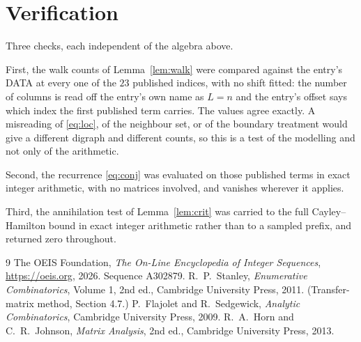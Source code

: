 \documentclass[11pt,a4paper]{article}
\theoremstyle{plain}
\theoremstyle{definition}
\begin{document}
\section{Verification}

Three checks, each independent of the algebra above.

First, the walk counts of Lemma~\ref{lem:walk} were compared against the entry's DATA at
every one of the $23$ published indices, with no shift fitted: the number of columns is
read off the entry's own name as $L=n$ and the entry's offset says which index the first
published term carries. The values agree exactly. A misreading of \eqref{eq:loc}, of the
neighbour set, or of the boundary treatment would give a different digraph and different
counts, so this is a test of the modelling and not only of the arithmetic.

Second, the recurrence \eqref{eq:conj} was evaluated on those published terms in exact
integer arithmetic, with no matrices involved, and vanishes wherever it applies.

Third, the annihilation test of Lemma~\ref{lem:crit} was carried to the full
Cayley--Hamilton bound in exact integer arithmetic rather than to a sampled prefix, and
returned zero throughout.

\begin{thebibliography}{9}
 The OEIS Foundation, \emph{The On-Line Encyclopedia of Integer
Sequences}, \url{https://oeis.org}, 2026. Sequence A302879.
 R.~P.~Stanley, \emph{Enumerative Combinatorics}, Volume 1, 2nd ed.,
Cambridge University Press, 2011. (Transfer-matrix method, Section 4.7.)
 P.~Flajolet and R.~Sedgewick, \emph{Analytic Combinatorics}, Cambridge
University Press, 2009.
 R.~A.~Horn and C.~R.~Johnson, \emph{Matrix Analysis}, 2nd ed., Cambridge
University Press, 2013.
\end{thebibliography}
\end{document}
